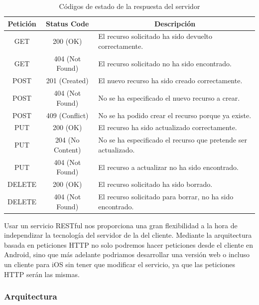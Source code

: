 \begin{table}[H]
\begin{tabular}{|c|c|m{7.5cm}|}
\hline
{\bf Petición} & {\bf Status Code} & \multicolumn{1}{c|}{{\bf Descripción}}                         \\ \hline
GET            & 200 (OK)          & El recurso solicitado ha sido devuelto correctamente.          \\ \hline
GET            & 404 (Not Found)   & El recurso solicitado no ha sido encontrado.                   \\ \hline
POST           & 201 (Created)     & El nuevo recurso ha sido creado correctamente.                 \\ \hline
POST           & 404 (Not Found)   & No se ha especificado el nuevo recurso a crear.                \\ \hline
POST           & 409 (Conflict)    & No se ha podido crear el recurso porque ya existe.             \\ \hline
PUT            & 200 (OK)          & El recurso ha sido actualizado correctamente.                  \\ \hline
PUT            & 204 (No Content)  & No se ha especificado el recurso que pretende ser actualizado. \\ \hline
PUT            & 404 (Not Found)   & El recurso a actualizar no ha sido encontrado.                 \\ \hline
DELETE         & 200 (OK)          & El recurso solicitado ha sido borrado.                         \\ \hline
DELETE         & 404 (Not Found)   & El recurso solicitado para borrar, no ha sido encontrado.      \\ \hline
\end{tabular}
\caption{Códigos de estado de la respuesta del servidor}
\label{fig:codeStateRestTable}
\end{table}

Usar un servicio RESTful nos proporciona una gran flexibilidad a la hora de independizar la tecnología del servidor de la del cliente. Mediante la arquitectura basada en peticiones HTTP no solo podremos hacer peticiones desde el cliente en Android, sino que más adelante podriamos desarrollar una versión web o incluso un cliente para iOS sin tener que modificar el servicio, ya que las peticiones HTTP serán las mismas.

\subsubsection{Arquitectura}

